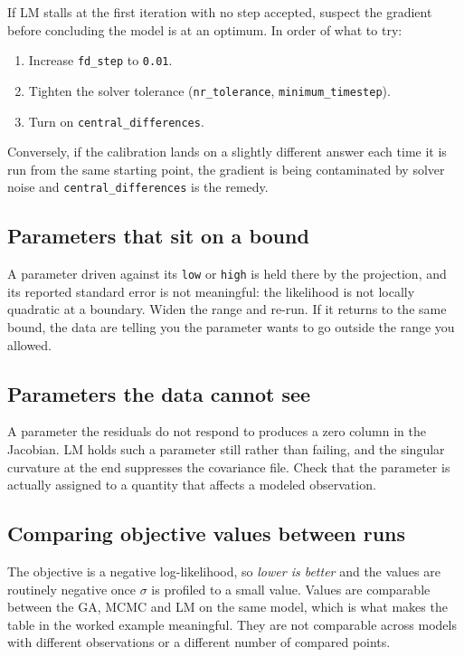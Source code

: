 \documentclass[11pt,a4paper]{article}
\newcommand{\code}[1]{\texttt{\small #1}}
\begin{document}
If LM stalls at the first iteration with no step accepted, suspect the gradient
before concluding the model is at an optimum. In order of what to try:

\begin{enumerate}[leftmargin=1.6em]
  \item Increase \code{fd\_step} to \code{0.01}.
  \item Tighten the solver tolerance (\code{nr\_tolerance}, \code{minimum\_timestep}).
  \item Turn on \code{central\_differences}.
\end{enumerate}

Conversely, if the calibration lands on a slightly different answer each time it
is run from the same starting point, the gradient is being contaminated by
solver noise and \code{central\_differences} is the remedy.

\subsection{Parameters that sit on a bound}

A parameter driven against its \code{low} or \code{high} is held there by the
projection, and its reported standard error is not meaningful: the likelihood is
not locally quadratic at a boundary. Widen the range and re-run. If it returns to
the same bound, the data are telling you the parameter wants to go outside the
range you allowed.

\subsection{Parameters the data cannot see}

A parameter the residuals do not respond to produces a zero column in the
Jacobian. LM holds such a parameter still rather than failing, and the singular
curvature at the end suppresses the covariance file. Check that the parameter is
actually assigned to a quantity that affects a modeled observation.

\subsection{Comparing objective values between runs}

The objective is a negative log-likelihood, so \emph{lower is better} and the
values are routinely negative once $\sigma$ is profiled to a small value. Values
are comparable between the GA, MCMC and LM on the same model, which is what
makes the table in the worked example meaningful. They are not comparable across
models with different observations or a different number of compared points.
\end{document}
